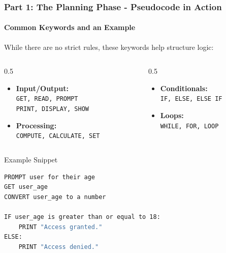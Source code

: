\documentclass{beamer}
\begin{document}
\begin{frame}[fragile]
    \frametitle{Part 1: The Planning Phase - Pseudocode in Action}
    \framesubtitle{Common Keywords and an Example}

    While there are no strict rules, these keywords help structure logic:
    \begin{columns}[T]
        \begin{column}{0.5\textwidth}
            \begin{itemize}
                \item \textbf{Input/Output:} \\ \texttt{GET, READ, PROMPT} \\ \texttt{PRINT, DISPLAY, SHOW}
                \item \textbf{Processing:} \\ \texttt{COMPUTE, CALCULATE, SET}
            \end{itemize}
        \end{column}
        \begin{column}{0.5\textwidth}
            \begin{itemize}
                \item \textbf{Conditionals:} \\ \texttt{IF, ELSE, ELSE IF}
                \item \textbf{Loops:} \\ \texttt{WHILE, FOR, LOOP}
            \end{itemize}
        \end{column}
    \end{columns}

    \begin{block}{Example Snippet}
\begin{lstlisting}[language=bash, basicstyle=\ttfamily\small]
PROMPT user for their age
GET user_age
CONVERT user_age to a number

IF user_age is greater than or equal to 18:
    PRINT "Access granted."
ELSE:
    PRINT "Access denied."
\end{lstlisting}
    \end{block}
\end{frame}
\end{document}
